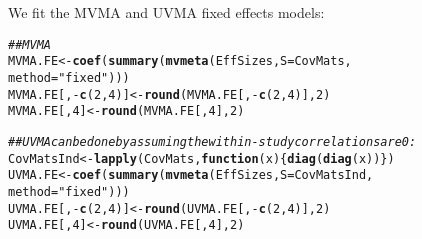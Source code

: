 \documentclass{article}\usepackage[]{graphicx}\usepackage[]{color}
\makeatletter
\newcommand{\hlnum}[1]{\textcolor[rgb]{0.686,0.059,0.569}{#1}}%
\newcommand{\hlstr}[1]{\textcolor[rgb]{0.192,0.494,0.8}{#1}}%
\newcommand{\hlcom}[1]{\textcolor[rgb]{0.678,0.584,0.686}{\textit{#1}}}%
\newcommand{\hlopt}[1]{\textcolor[rgb]{0,0,0}{#1}}%
\newcommand{\hlstd}[1]{\textcolor[rgb]{0.345,0.345,0.345}{#1}}%
\newcommand{\hlkwa}[1]{\textcolor[rgb]{0.161,0.373,0.58}{\textbf{#1}}}%
\newcommand{\hlkwb}[1]{\textcolor[rgb]{0.69,0.353,0.396}{#1}}%
\newcommand{\hlkwc}[1]{\textcolor[rgb]{0.333,0.667,0.333}{#1}}%
\newcommand{\hlkwd}[1]{\textcolor[rgb]{0.737,0.353,0.396}{\textbf{#1}}}%
\newenvironment{kframe}{%
 \def\at@end@of@kframe{}%
 \ifinner\ifhmode%
  \def\at@end@of@kframe{\end{minipage}}%
  \begin{minipage}{\columnwidth}%
 \fi\fi%
 \def\FrameCommand##1{\hskip\@totalleftmargin \hskip-\fboxsep
 \colorbox{shadecolor}{##1}\hskip-\fboxsep
     \hskip-\linewidth \hskip-\@totalleftmargin \hskip\columnwidth}%
 \MakeFramed {\advance\hsize-\width
   \@totalleftmargin\z@ \linewidth\hsize
   \@setminipage}}%
 {\par\unskip\endMakeFramed%
 \at@end@of@kframe}
\newenvironment{knitrout}{}{} %
\makeatother
\begin{document}
We fit the MVMA and UVMA fixed effects models:
\begin{knitrout}
\color{fgcolor}\begin{kframe}
\begin{alltt}
\hlcom{##MVMA}
\hlstd{MVMA.FE} \hlkwb{<-} \hlkwd{coef}\hlstd{(}\hlkwd{summary}\hlstd{(}\hlkwd{mvmeta}\hlstd{(EffSizes,} \hlkwc{S} \hlstd{= CovMats,}
                               \hlkwc{method}\hlstd{=}\hlstr{"fixed"}\hlstd{)))}
\hlstd{MVMA.FE[,} \hlopt{-}\hlkwd{c}\hlstd{(}\hlnum{2}\hlstd{,}\hlnum{4}\hlstd{)]} \hlkwb{<-} \hlkwd{round}\hlstd{(MVMA.FE[,} \hlopt{-}\hlkwd{c}\hlstd{(}\hlnum{2}\hlstd{,}\hlnum{4}\hlstd{)],} \hlnum{2}\hlstd{)}
\hlstd{MVMA.FE[,} \hlnum{4}\hlstd{]} \hlkwb{<-} \hlkwd{round}\hlstd{(MVMA.FE[,} \hlnum{4}\hlstd{],} \hlnum{2}\hlstd{)}

\hlcom{##UVMA can be done by assuming the within-study correlations are 0:}
\hlstd{CovMatsInd} \hlkwb{<-} \hlkwd{lapply}\hlstd{(CovMats,} \hlkwa{function}\hlstd{(}\hlkwc{x}\hlstd{) \{}\hlkwd{diag}\hlstd{(}\hlkwd{diag}\hlstd{(x))\})}
\hlstd{UVMA.FE} \hlkwb{<-} \hlkwd{coef}\hlstd{(}\hlkwd{summary}\hlstd{(}\hlkwd{mvmeta}\hlstd{(EffSizes,} \hlkwc{S} \hlstd{= CovMatsInd,}
                               \hlkwc{method}\hlstd{=}\hlstr{"fixed"}\hlstd{)))}
\hlstd{UVMA.FE[,} \hlopt{-}\hlkwd{c}\hlstd{(}\hlnum{2}\hlstd{,}\hlnum{4}\hlstd{)]} \hlkwb{<-} \hlkwd{round}\hlstd{(UVMA.FE[,} \hlopt{-}\hlkwd{c}\hlstd{(}\hlnum{2}\hlstd{,}\hlnum{4}\hlstd{)],} \hlnum{2}\hlstd{)}
\hlstd{UVMA.FE[,} \hlnum{4}\hlstd{]} \hlkwb{<-} \hlkwd{round}\hlstd{(UVMA.FE[,} \hlnum{4}\hlstd{],} \hlnum{2}\hlstd{)}
\end{alltt}
\end{kframe}
\end{knitrout}
\end{document}
